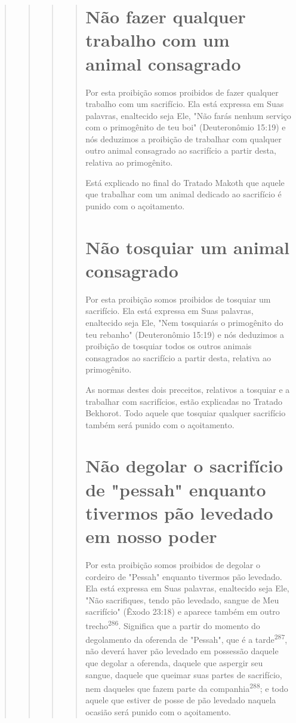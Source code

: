 \begin{quote}
\begin{quote}
\begin{quote}
\begin{quote}

\section{Não fazer qualquer trabalho com um animal consagrado}

Por esta proibição somos proibidos de fazer qualquer trabalho com um
sacrifício. Ela está expressa em Suas palavras, enaltecido seja Ele,
"Não fa­rás nenhum serviço com o primogênito de teu boi" (Deuteronômio
15:19) e nós deduzimos a proibição de trabalhar com qualquer outro
animal consagra­do ao sacrifício a partir desta, relativa ao
primogênito.

Está explicado no final do Tratado Makoth que aquele que trabalhar com
um animal dedicado ao sacrifício é punido com o açoitamento.

\section{Não tosquiar um animal consagrado}

Por esta proibição somos proibidos de tosquiar um sacrifício. Ela es­tá
expressa em Suas palavras, enaltecido seja Ele, "Nem tosquiarás o
primogê­nito do teu rebanho" (Deuteronômio 15:19) e nós deduzimos a
proibição de tosquiar todos os outros animais consagrados ao sacrifício
a partir desta, relati­va ao primogênito.

As normas destes dois preceitos, relativos a tosquiar e a trabalhar com
sacrifícios, estão explicadas no Tratado Bekhorot. Todo aquele que
tosquiar qualquer sacrifício também será punido com o açoitamento.

\section{Não degolar o sacrifício de "pessah" enquanto tivermos pão levedado em nosso poder}

Por esta proibição somos proibidos de degolar o cordeiro de "Pes­sah"
enquanto tivermos pão levedado. Ela está expressa em Suas palavras,
enal­tecido seja Ele, "Não sacrifiques, tendo pão levedado, sangue de
Meu sacrifí­cio" (Êxodo 23:18) e aparece também em outro
trecho\textsuperscript{286}. Significa que a par­tir do momento do
degolamento da oferenda de "Pessah", que é a tarde\textsuperscript{287},
não deverá haver pão levedado em possessão daquele que degolar a
oferenda, daquele que aspergir seu sangue, daquele que queimar suas
partes de sacrifício, nem daqueles que fazem parte da
companhia\textsuperscript{288}; e todo aquele que estiver de posse de
pão levedado naquela ocasião será punido com o açoitamento.


\end{quote}
\end{quote}
\end{quote}
\end{quote}
